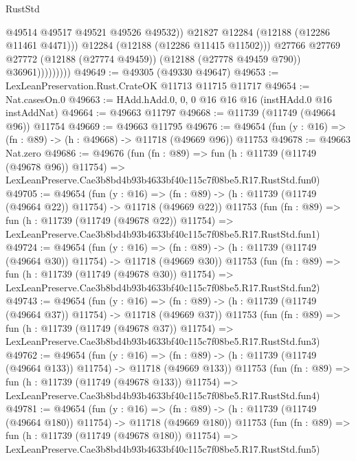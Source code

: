 \begin{lexlean}{RustStd}
\begin{coremodule}
                              @49514
                              @49517
                              @49521
                              @49526
                              @49532))
                          @21827
                          @12284
                          (@12188 (@12286 @11461 @4471)))
                        @12284
                        (@12188 (@12286 @11415 @11502)))
                      @27766
                      @27769
                      @27772
                      (@12188 (@27774 @49459))
                      (@12188 (@27778 @49459 @790))
                      @36961)))))))))
@49649 := @49305 (@49330 @49647)
@49653 := LexLeanPreservation.Rust.CrateOK @11713 @11715 @11717
@49654 := Nat.casesOn.{0}
@49663 := HAdd.hAdd.{0, 0, 0} @16 @16 @16 (instHAdd.{0} @16 instAddNat)
@49664 := @49663 @11797
@49668 := @11739 (@11749 (@49664 @96)) @11754
@49669 := @49663 @11795
@49676 := @49654 (fun (y : @16) => (fn : @89) -> (h : @49668) -> @11718 (@49669 @96)) @11753
@49678 := @49663 Nat.zero
@49686 := @49676
    (fun (fn : @89) =>
    fun (h : @11739 (@11749 (@49678 @96)) @11754) =>
    LexLeanPreserve.Cae3b8bd4b93b4633bf40c115c7f08be5.R17.RustStd.fun0)
@49705 := @49654
    (fun (y : @16) =>
    (fn : @89) -> (h : @11739 (@11749 (@49664 @22)) @11754) -> @11718 (@49669 @22))
    @11753
    (fun (fn : @89) =>
    fun (h : @11739 (@11749 (@49678 @22)) @11754) =>
    LexLeanPreserve.Cae3b8bd4b93b4633bf40c115c7f08be5.R17.RustStd.fun1)
@49724 := @49654
    (fun (y : @16) =>
    (fn : @89) -> (h : @11739 (@11749 (@49664 @30)) @11754) -> @11718 (@49669 @30))
    @11753
    (fun (fn : @89) =>
    fun (h : @11739 (@11749 (@49678 @30)) @11754) =>
    LexLeanPreserve.Cae3b8bd4b93b4633bf40c115c7f08be5.R17.RustStd.fun2)
@49743 := @49654
    (fun (y : @16) =>
    (fn : @89) -> (h : @11739 (@11749 (@49664 @37)) @11754) -> @11718 (@49669 @37))
    @11753
    (fun (fn : @89) =>
    fun (h : @11739 (@11749 (@49678 @37)) @11754) =>
    LexLeanPreserve.Cae3b8bd4b93b4633bf40c115c7f08be5.R17.RustStd.fun3)
@49762 := @49654
    (fun (y : @16) =>
    (fn : @89) -> (h : @11739 (@11749 (@49664 @133)) @11754) -> @11718 (@49669 @133))
    @11753
    (fun (fn : @89) =>
    fun (h : @11739 (@11749 (@49678 @133)) @11754) =>
    LexLeanPreserve.Cae3b8bd4b93b4633bf40c115c7f08be5.R17.RustStd.fun4)
@49781 := @49654
    (fun (y : @16) =>
    (fn : @89) -> (h : @11739 (@11749 (@49664 @180)) @11754) -> @11718 (@49669 @180))
    @11753
    (fun (fn : @89) =>
    fun (h : @11739 (@11749 (@49678 @180)) @11754) =>
    LexLeanPreserve.Cae3b8bd4b93b4633bf40c115c7f08be5.R17.RustStd.fun5)

\end{coremodule}
\end{lexlean}
